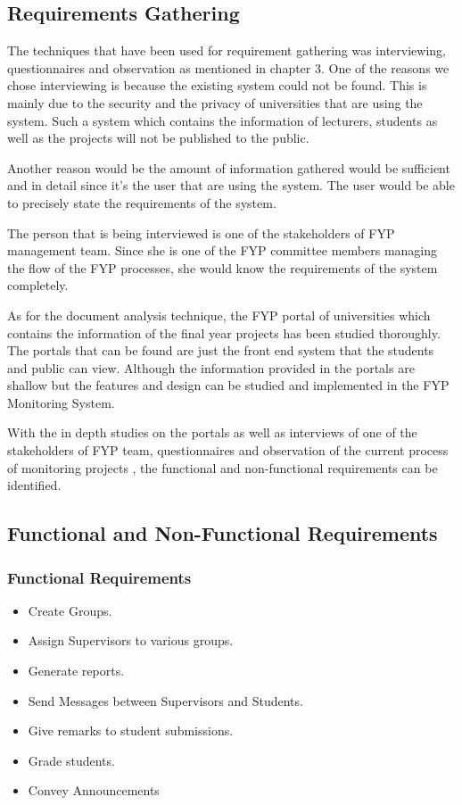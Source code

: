 \documentclass{article}
\begin{document}
\subsection{Requirements Gathering}
\par The techniques that have been used for requirement gathering was interviewing, questionnaires and observation as mentioned in chapter 3. One of the reasons we chose interviewing is because the existing system could not be found. This is mainly due to the security and the privacy of universities that are using the system. Such a system which contains the information of lecturers, students as well as the projects will not be published to the public.\cite{alousmart}
\par Another reason would be the amount of information gathered would be sufficient and in detail since it’s the user that are using the system. The user would be able to precisely state the requirements of the system.
\par The person that is being interviewed is one of the stakeholders of FYP management team. Since she is one of the FYP committee members managing the flow of the FYP processes, she would know the requirements of the system completely.
\par As for the document analysis technique, the FYP portal of universities which contains the information of the final year projects has been studied thoroughly. The portals that can be found are just the front end system that the students and public can view. Although the information provided in the portals are shallow but the features and design can be studied and implemented in the FYP Monitoring System.
\par With the in depth studies on the portals as well as interviews of  one of the stakeholders of FYP team, questionnaires and observation of the current process of monitoring projects , the functional and non-functional requirements can be identified.
\subsection{Functional and Non-Functional Requirements}
\subsubsection{Functional Requirements}
\begin{itemize}
\item Create Groups.
\item Assign Supervisors to various groups.
\item Generate reports.
\item Send Messages between Supervisors and Students.
\item Give remarks to student submissions.
\item Grade students.
\item Convey Announcements
\end{itemize}
\end{document}

